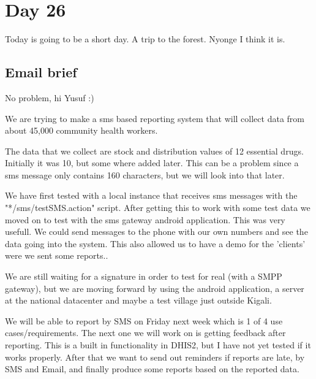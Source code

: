 \section{Day 26}
Today is going to be a short day.
A trip to the forest. Nyonge I think it is.

\subsection{Email brief}
No problem, hi Yusuf :)

We are trying to make a sms based reporting system that will collect data from about 45,000 community health workers.

The data that we collect are stock and distribution values of 12 essential drugs. Initially it was 10, but some where added later. This can be a problem since a sms message only contains 160 characters, but we will look into that later.

We have first tested with a local instance that receives sms messages with the "*/sms/testSMS.action" script.
After getting this to work with some test data we moved on to test with the sms gateway android application.
This was very usefull. We could send messages to the phone with our own numbers and see the data going into the system. This also allowed us to have a demo for the 'clients' were we sent some reports.. 

We are still waiting for a signature in order to test for real (with a SMPP gateway), but we are moving forward by using the android application, a server at the national datacenter and maybe a test village just outside Kigali.

We will be able to report by SMS on Friday next week which is 1 of 4 use cases/requirements.
The next one we will work on is getting feedback after reporting. This is a built in functionality in DHIS2, but I have not yet tested if it works properly. After that we want to send out reminders if reports are late, by SMS and Email, and finally produce some reports based on the reported data.